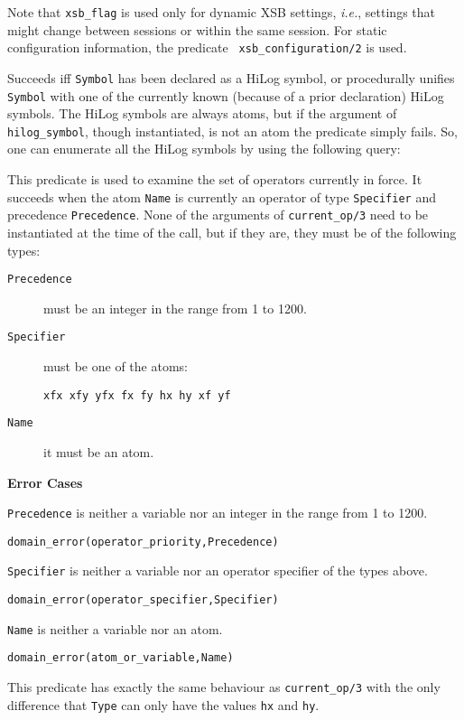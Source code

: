 \begin{description}
    Note that {\tt xsb\_flag} is used only for dynamic XSB settings, {\it
      i.e.}, settings that might change between sessions or within the same
    session. For static configuration information, the predicate {\tt
      xsb\_configuration/2} is used.  

    Succeeds iff {\tt Symbol} has been declared as a HiLog symbol, or 
    procedurally unifies {\tt Symbol} with one of the currently known 
    (because of a prior declaration) HiLog symbols. The HiLog symbols
    are always atoms, but if the argument of {\tt hilog\_symbol},
    though instantiated, is not an atom the predicate simply fails.
    So, one can enumerate all the HiLog symbols by using the following
    query:


    This predicate is used to examine the set of operators currently
    in force.  It succeeds when the atom {\tt Name} is currently an
    operator of type {\tt Specifier} and precedence {\tt Precedence}.  None
    of the arguments of {\tt current\_op/3} need to be instantiated at
    the time of the call, but if they are, they must be of the
    following types: 
\begin{description}
\item[{\tt Precedence}] must be an integer in the range from 1 to 1200.  
\item[{\tt Specifier}] must be one of the atoms: 
\begin{verbatim} 
xfx xfy yfx fx fy hx hy xf yf 
\end{verbatim} 
\item[{\tt Name}] it must be an atom.
\end{description}

{\bf Error Cases}
\bi
\item 	{\tt Precedence} is neither a variable nor an integer in the
range from 1 to 1200. 
\bi
\item 	{\tt domain\_error(operator\_priority,Precedence)}
\ei
\item 	{\tt Specifier} is neither a variable nor an operator
specifier of the types above.
\bi
\item 	{\tt domain\_error(operator\_specifier,Specifier)}
\ei
\item 	{\tt Name} is neither a variable nor an atom.
\bi
\item 	{\tt domain\_error(atom\_or\_variable,Name)}
\ei
\ei

    This predicate has exactly the same behaviour as {\tt current\_op/3}
    with the only difference that {\tt Type} can only have the values
    {\tt hx} and {\tt hy}.
\end{description}


